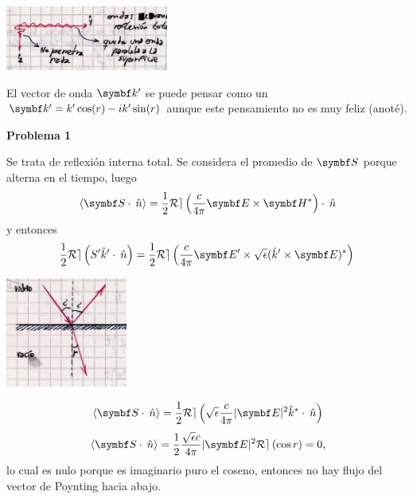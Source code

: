 \documentclass[10pt,oneside]{CBFT_book}
\begin{document}
\includegraphics[width=0.4\textwidth]{images/fig_ft1_reflexion_total.jpg}

El vector de onda $\vb{k}'$ se puede pensar como un $\vb{k}'= k'\cos(r) - ik'\sin(r)$ aunque
este pensamiento no es muy feliz (anoté).


\begin{ejemplo}{\bf Problema 1}
 
Se trata de reflexión interna total.
Se considera el promedio de $\vb{S}$ porque alterna en el tiempo, luego
\[
	\vm{\vb{S}\cdot\nver} = \frac 1 2 \mathcal{Re}\left( \frac{c}{4\pi} 
	\vb{E}\times\vb{H}^*\right) \cdot \nver
\]
y entonces
\[
	\frac 1 2 \mathcal{Re}\left( S'\hat{k}'\cdot\nver \right) =
	\frac 1 2 \mathcal{Re}\left( \frac{c}{4\pi} 
	\vb{E}'\times\sqrt{\epsilon}( \hat{k}'\times\vb{E})^*\right)
\]

\includegraphics[width=0.3\textwidth]{images/fig_ft1_problema1_ondas.jpg}

\[
	\vm{\vb{S}\cdot\nver} = \frac{1}{2}  \mathcal{Re}\left( 
	\sqrt{\epsilon} \frac{c}{4\pi} |\vb{E}|^2 \hat{k}^*\cdot\nver \right)
\]
\[
	\vm{\vb{S}\cdot\nver} = \frac{1}{2} \frac{ \sqrt{\epsilon} c}{4\pi} |\vb{E}|^2
	\mathcal{Re}\left( \cos r \right)
	= 0,
\]
lo cual es nulo porque es imaginario puro el coseno, entonces no hay flujo del vector 
de Poynting hacia abajo.
 
\end{ejemplo}
\end{document}
